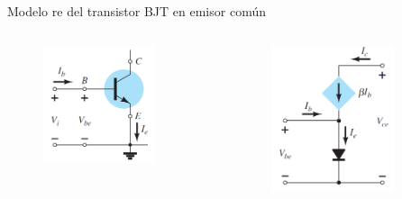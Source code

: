 \documentclass[t,aspectratio=169]{beamer}
\begin{document}
\begin{frame}{Modelo re del transistor BJT en emisor común}
\begin{columns}
\begin{column}{0.33\textwidth}
\begin{figure}[H]
    \centering
    \includegraphics[width=0.8\textwidth]{figuras/modelo_re_ec_1.png}
\end{figure}
\end{column}
\begin{column}{0.33\textwidth}
\begin{figure}[H]
    \centering
    \includegraphics[width=0.8\textwidth]{figuras/modelo_re_ec_2.png}

\end{figure}
\end{column}
\end{columns}
\end{frame}
\end{document}
